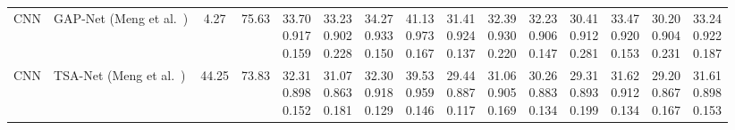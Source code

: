 \documentclass[letterpaper]{article} %
\begin{document}
\begin{table}[!t]
{\begin{tabular}{ll|cc|*{10}{c}|c}
\rowcolor{costgray}
CNN & GAP-Net (Meng et al.~\citeyear{meng2020gapnet}) & 4.27 & 75.63 & \makecell{33.70\\0.917\\0.159} & \makecell{33.23\\0.902\\0.228} & \makecell{34.27\\0.933\\0.150} & \makecell{41.13\\0.973\\0.167} & \makecell{31.41\\0.924\\0.137} & \makecell{32.39\\0.930\\0.220} & \makecell{32.23\\0.906\\0.147} & \makecell{30.41\\0.912\\0.281} & \makecell{33.47\\0.920\\0.153} & \makecell{30.20\\0.904\\0.231} & \makecell{33.24\\0.922\\0.187} \\
\rowcolor{costgray}
CNN & TSA-Net (Meng et al.~\citeyear{meng2020tsanet}) & 44.25 & 73.83 & \makecell{32.31\\0.898\\0.152} & \makecell{31.07\\0.863\\0.181} & \makecell{32.30\\0.918\\0.129} & \makecell{39.53\\0.959\\0.146} & \makecell{29.44\\0.887\\0.117} & \makecell{31.06\\0.905\\0.169} & \makecell{30.26\\0.883\\0.134} & \makecell{29.31\\0.893\\0.199} & \makecell{31.62\\0.912\\0.134} & \makecell{29.20\\0.867\\0.167} & \makecell{31.61\\0.898\\0.153} \\

\end{tabular}}
\end{table}
\end{document}
